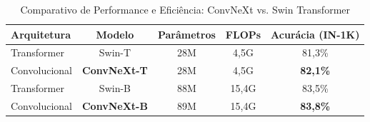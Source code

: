 \begin{table}[ht]
\centering
\caption{Comparativo de Performance e Eficiência: ConvNeXt vs. Swin Transformer}
\label{tab:convnext_vs_swin}
\begin{tabular}{@{}lcccc@{}}
\toprule
\textbf{Arquitetura} & \textbf{Modelo} & \textbf{Parâmetros} & \textbf{FLOPs} & \textbf{Acurácia (IN-1K)} \\ \midrule
Transformer & Swin-T & 28M & 4,5G & 81,3\% \\
Convolucional & \textbf{ConvNeXt-T} & 28M & 4,5G & \textbf{82,1\%} \\ \midrule
Transformer & Swin-B & 88M & 15,4G & 83,5\% \\
Convolucional & \textbf{ConvNeXt-B} & 89M & 15,4G & \textbf{83,8\%} \\ \bottomrule
\end{tabular}
\end{table}